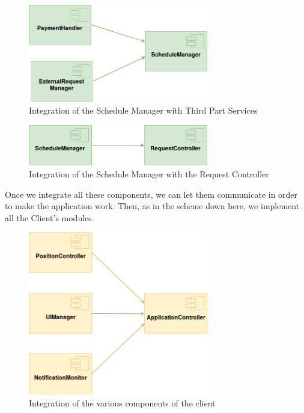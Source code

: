 \documentclass[numbers=noenddot, 12pt, a4paper, oneside]{scrbook}
\begin{document}
\begin{figure}[H]
	\centering
	\includegraphics[width=0.7\textwidth,angle=-0]{images/impleServer3}
	\caption{Integration of the Schedule Manager with Third Part Services}
\end{figure}

\begin{figure}[H]
	\centering
	\includegraphics[width=0.7\textwidth,angle=-0]{images/impleServer4}
	\caption{Integration of the Schedule Manager with the Request Controller}
\end{figure}

Once we integrate all these components, we can let them communicate in order to make the application work. Then, as in the scheme down here, we implement all the Client's modules.


\begin{figure}[H]
	\centering
	\includegraphics[width=0.7\textwidth,angle=-0]{images/implClient}
	\caption{Integration of the various components of the client}
\end{figure}
\end{document}
